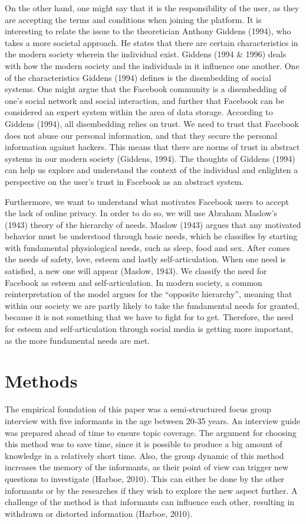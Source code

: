 On the other hand, one might say that it is the responsibility of the user, as they are accepting the terms and conditions when joining the platform. It is interesting to relate the issue to the theoretician Anthony Giddens (1994), who takes a more societal approach. He states that there are certain characteristics in the modern society wherein the individual exist. Giddens (1994 \& 1996) deals with how the modern society and the individuals in it influence one another. One of the characteristics Giddens (1994) defines is the disembedding of social systems. One might argue that the Facebook community is a disembedding of one's social network and social interaction, and further that Facebook can be considered an expert system within the area of data storage. According to Giddens (1994), all disembedding relies on trust. We need to trust that Facebook does not abuse our personal information, and that they secure the personal information against hackers. This means that there are norms of trust in abstract systems in our modern society (Giddens, 1994). The thoughts of Giddens (1994) can help us explore and understand the context of the individual and enlighten a perspective on the user’s trust in Facebook as an abstract system.

Furthermore, we want to understand what motivates Facebook users to accept the lack of online privacy. In order to do so, we will use Abraham Maslow’s (1943) theory of the hierarchy of needs. Maslow (1943) argues that any motivated behavior must be understood through basic needs, which he classifies by starting with fundamental physiological needs, such as sleep, food and sex. After comes the needs of safety, love, esteem and lastly self-articulation. When one need is satisfied, a new one will appear (Maslow, 1943). We classify the need for Facebook as esteem and self-articulation. In modern society, a common reinterpretation of the model argues for the “opposite hierarchy”, meaning that within our society we are partly likely to take the fundamental needs for granted, because it is not something that we have to fight for to get. Therefore, the need for esteem and self-articulation through social media is getting more important, as the more fundamental needs are met.

\section{Methods}
The empirical foundation of this paper was a semi-structured focus group interview with five informants in the age between 20-35 years. An interview guide was prepared ahead of time to ensure topic coverage. The argument for choosing this method was to save time, since it is possible to produce a big amount of knowledge in a relatively short time. Also, the group dynamic of this method increases the memory of the informants, as their point of view can trigger new questions to investigate (Harboe, 2010). This can either be done by the other informants or by the researches if they wish to explore the new aspect further. A challenge of the method is that informants can influence each other, resulting in withdrawn or distorted information (Harboe, 2010).

